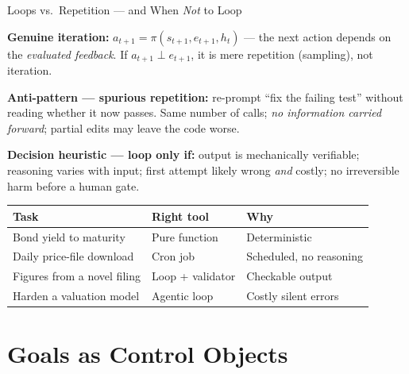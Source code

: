 \documentclass[9pt,t]{beamer}
\begin{document}
\begin{frame}{Loops vs.\ Repetition --- and When \emph{Not} to Loop}

\begin{underhood}
\textbf{Genuine iteration:} $a_{t+1} = \pi(s_{t+1}, e_{t+1}, h_t)$ --- the next
action depends on the \emph{evaluated feedback}. If $a_{t+1}\perp e_{t+1}$, it is
\alert{mere repetition} (sampling), not iteration.
\end{underhood}

\medskip
\textbf{Anti-pattern --- spurious repetition:} re-prompt ``fix the failing test''
without reading whether it now passes. Same number of calls; \emph{no information
carried forward}; partial edits may leave the code worse.

\medskip
\textbf{Decision heuristic --- loop only if:} output is mechanically verifiable;
reasoning varies with input; first attempt likely wrong \emph{and} costly; no
irreversible harm before a human gate.

\medskip
\begin{tabular}{@{}lll@{}}
\toprule
\textbf{Task} & \textbf{Right tool} & \textbf{Why} \\
\midrule
Bond yield to maturity & Pure function & Deterministic \\
Daily price-file download & Cron job & Scheduled, no reasoning \\
Figures from a novel filing & Loop + validator & Checkable output \\
Harden a valuation model & Agentic loop & Costly silent errors \\
\bottomrule
\end{tabular}
\end{frame}

\section{Goals as Control Objects}
\end{document}
